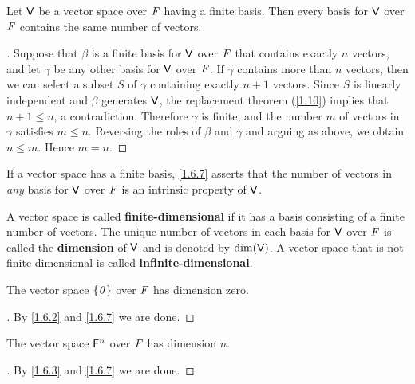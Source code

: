 \begin{cor}\label{1.6.7}
  Let \(\mathsf{V}\) be a vector space over \(\mathit{F}\) having a finite basis.
  Then every basis for \(\mathsf{V}\) over \(\mathit{F}\) contains the same number of vectors.
\end{cor}

\begin{proof}[]
  Suppose that \(\beta\) is a finite basis for \(\mathsf{V}\) over \(\mathit{F}\) that contains exactly \(n\) vectors, and let \(\gamma\) be any other basis for \(\mathsf{V}\) over \(\mathit{F}\).
  If \(\gamma\) contains more than \(n\) vectors, then we can select a subset \(S\) of \(\gamma\) containing exactly \(n + 1\) vectors.
  Since \(S\) is linearly independent and \(\beta\) generates \(\mathsf{V}\), the replacement theorem (\cref{1.10}) implies that \(n + 1 \leq n\), a contradiction.
  Therefore \(\gamma\) is finite, and the number \(m\) of vectors in \(\gamma\) satisfies \(m \leq n\).
  Reversing the roles of \(\beta\) and \(\gamma\) and arguing as above, we obtain \(n \leq m\).
  Hence \(m = n\).
\end{proof}

\begin{note}
  If a vector space has a finite basis, \cref{1.6.7} asserts that the number of vectors in \emph{any} basis for \(\mathsf{V}\) over \(\mathit{F}\) is an intrinsic property of \(\mathsf{V}\).
\end{note}

\begin{defn}\label{1.6.8}
  A vector space is called \textbf{finite-dimensional} if it has a basis consisting of a finite number of vectors.
  The unique number of vectors in each basis for \(\mathsf{V}\) over \(\mathit{F}\) is called the \textbf{dimension} of \(\mathsf{V}\) and is denoted by \(\dim(\mathsf{V})\).
  A vector space that is not finite-dimensional is called \textbf{infinite-dimensional}.
\end{defn}

\begin{eg}\label{1.6.9}
  The vector space \(\left\lbrace\mathit{0}\right\rbrace\) over \(\mathit{F}\) has dimension zero.
\end{eg}

\begin{proof}[]
  By \cref{1.6.2} and \cref{1.6.7} we are done.
\end{proof}

\begin{eg}\label{1.6.10}
  The vector space \(\mathsf{F}^n\) over \(\mathit{F}\) has dimension \(n\).
\end{eg}

\begin{proof}[]
  By \cref{1.6.3} and \cref{1.6.7} we are done.
\end{proof}

